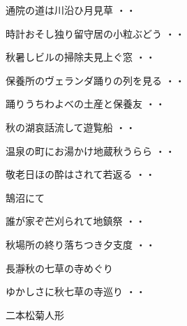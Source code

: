 \begin{shiika}通院の道は川沿ひ月見草
\hfill{・・}\end{shiika}
\vspace{0.6cm}
\begin{shiika}時計おそし独り留守居の小粒ぶどう
\hfill{・・}\end{shiika}
\vspace{0.6cm}
\begin{shiika}秋暑しビルの掃除夫見上ぐ窓
\hfill{・・}\end{shiika}
\vspace{0.6cm}
\begin{shiika}保養所のヴェランダ踊りの列を見る
\hfill{・・}\end{shiika}
\vspace{0.6cm}
\begin{shiika}踊りうちわよべの土産と保養友
\hfill{・・}\end{shiika}
\vspace{0.6cm}
\begin{shiika}秋の湖哀話流して遊覧船
\hfill{・・}\end{shiika}
\vspace{0.6cm}
\begin{shiika}温泉の町にお湯かけ地蔵秋うらら
\hfill{・・}\end{shiika}
\vspace{0.6cm}
\begin{shiika}敬老日ほの酔はされて若返る
\hfill{・・}\end{shiika}
\vspace{0.6cm}
鵠沼にて
\begin{shiika}誰が家ぞ芒刈られて地鎮祭
\hfill{・・}\end{shiika}
\begin{shiika}秋場所の終り落ちつき夕支度
\hfill{・・}\end{shiika}
\vspace{0.6cm}
長瀞秋の七草の寺めぐり
\begin{shiika}ゆかしさに秋七草の寺巡り
\hfill{・・}\end{shiika}
\vspace{0.6cm}
二本松菊人形		
